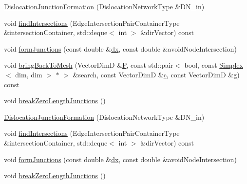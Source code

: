 \begin{DoxyCompactItemize}
\item 
\hyperlink{classmodel_1_1_dislocation_junction_formation_a41b0e35d48c4dbefffa6497d85a1ca23}{Dislocation\+Junction\+Formation} (Dislocation\+Network\+Type \&D\+N\+\_\+in)
\item 
void \hyperlink{classmodel_1_1_dislocation_junction_formation_ac221fb741cdd99200b940c54536b9954}{find\+Intersections} (Edge\+Intersection\+Pair\+Container\+Type \&intersection\+Container, std\+::deque$<$ int $>$ \&dir\+Vector) const 
\item 
void \hyperlink{classmodel_1_1_dislocation_junction_formation_af6d36e51b2555c53308f4ebd079533cf}{form\+Junctions} (const double \&\hyperlink{plot_stress_strain_8m_ab96839a247dbd3da79b8919833960d34}{dx}, const double \&avoid\+Node\+Intersection)
\item 
void \hyperlink{classmodel_1_1_dislocation_junction_formation_ad16e3bdc4cc39de0882c6fd07bc4ae7e}{bring\+Back\+To\+Mesh} (Vector\+Dim\+D \&\hyperlink{_f_e_m_2linear__elasticity__3d_2tetgen_2generate_p_o_l_ycube_8m_a50a9afb44201a65ab7ad5feb2150aeb6}{P}, const std\+::pair$<$ bool, const \hyperlink{classmodel_1_1_simplex}{Simplex}$<$ dim, dim $>$ $\ast$ $>$ \&search, const Vector\+Dim\+D \&\hyperlink{plot_cells_8m_aa49cfdd4fa4d74d71f78a001a1b635d0}{c}, const Vector\+Dim\+D \&\hyperlink{tube_plotter_8m_a86bdec0d61a48a8ca4da1674058837cc}{g}) const 
\item 
void \hyperlink{classmodel_1_1_dislocation_junction_formation_a917702ae046622ccaf363550176908ec}{break\+Zero\+Length\+Junctions} ()
\item 
\hyperlink{classmodel_1_1_dislocation_junction_formation_a41b0e35d48c4dbefffa6497d85a1ca23}{Dislocation\+Junction\+Formation} (Dislocation\+Network\+Type \&D\+N\+\_\+in)
\item 
void \hyperlink{classmodel_1_1_dislocation_junction_formation_ac221fb741cdd99200b940c54536b9954}{find\+Intersections} (Edge\+Intersection\+Pair\+Container\+Type \&intersection\+Container, std\+::deque$<$ int $>$ \&dir\+Vector) const 
\item 
void \hyperlink{classmodel_1_1_dislocation_junction_formation_af6d36e51b2555c53308f4ebd079533cf}{form\+Junctions} (const double \&\hyperlink{plot_stress_strain_8m_ab96839a247dbd3da79b8919833960d34}{dx}, const double \&avoid\+Node\+Intersection)
\item 
void \hyperlink{classmodel_1_1_dislocation_junction_formation_a917702ae046622ccaf363550176908ec}{break\+Zero\+Length\+Junctions} ()
\end{DoxyCompactItemize}
